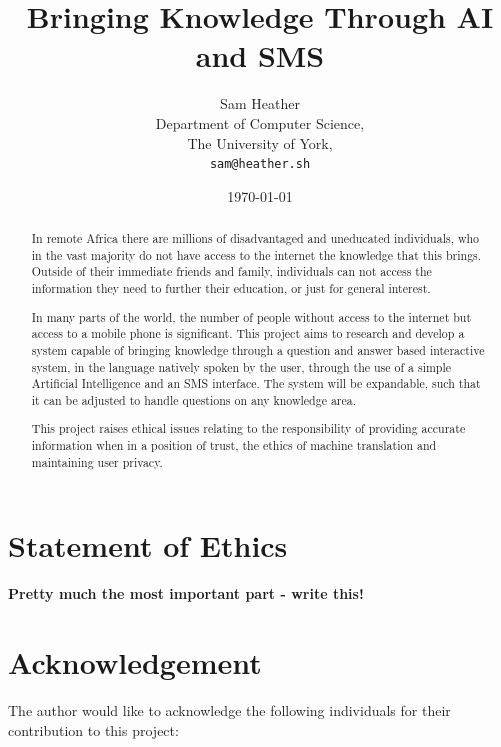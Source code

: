 \documentclass{article}
\begin{document}
\title{Bringing Knowledge Through AI and SMS}
\author{Sam Heather\\
  Department of Computer Science,\\
  The University of York,\\
  \texttt{sam@heather.sh}}
\date{\today}
\maketitle
\thispagestyle{empty}

\newpage

\begin{abstract}


In remote Africa there are millions of disadvantaged and uneducated individuals, who in the vast majority do not have access to the internet the knowledge that this brings.  Outside of their immediate friends and family, individuals can not access the information they need to further their education, or just for general interest.

In many parts of the world, the number of people without access to the internet but access to a mobile phone is significant.  This project aims to research and develop a system capable of bringing knowledge through a question and answer based interactive system, in the language natively spoken by the user, through the use of a simple Artificial Intelligence and an SMS interface.  The system will be expandable, such that it can be adjusted to handle questions on any knowledge area.

This project raises ethical issues relating to the responsibility of providing accurate information when in a position of trust, the ethics of machine translation and maintaining user privacy.
\end{abstract}

\newpage
\tableofcontents
\newpage
\listoffigures
\newpage
\listoftables
\newpage

\section*{Statement of Ethics}
{\bf Pretty much the most important part - write this!}

\newpage
\section*{Acknowledgement}
The author would like to acknowledge the following individuals for their contribution to this project:
\end{document}
